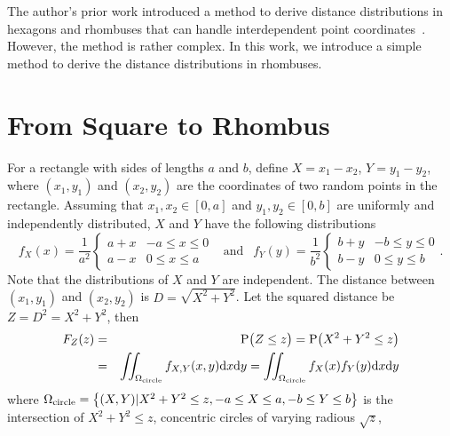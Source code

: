 \documentclass[12pt,draftclsnofoot,onecolumn]{IEEEtran}
\begin{document}
The author's prior work introduced a method to derive 
distance distributions in hexagons and rhombuses that can handle
interdependent point coordinates~\cite{zhuang2011random, 
zhuang2012geometrical}. However, the method is rather complex. In this 
work, we introduce a simple method to derive the distance distributions 
in rhombuses.

\section{From Square to Rhombus}
For a rectangle with sides of lengths $a$ and $b$, define $X=x_1-x_2$,
$Y=y_1-y_2$, where $(x_1, y_1)$ and $(x_2, y_2)$ are the coordinates of two
random points in the rectangle. Assuming that $x_1, x_2 \in [0,a]$ and $y_1, y_2 \in
[0, b]$ are uniformly and independently distributed, $X$ and $Y$ have the following
distributions
\begin{equation}\label{eq:fxy}
  f_X(x)=\frac{1}{a^2}\left\{
    \begin{array}{lr}
      a+x & -a\leq x \leq 0 \\
      a-x & 0 \leq x \leq a
    \end{array}
  \right.
  ~~\mbox{ and }~~ f_Y(y)=\frac{1}{b^2}\left\{
    \begin{array}{lr}
      b+y & -b\leq y \leq 0 \\
      b-y & 0 \leq y \leq b
    \end{array}
  \right..
\end{equation}
%
Note that the distributions of $X$ and $Y$ are independent. The
distance between $(x_1, y_1)$ and $(x_2, y_2)$ is $D=\sqrt{X^2+Y^2}$. Let the
squared distance be $Z=D^2=X^2+Y^2$, then
\begin{eqnarray}\label{eq-rec}
F_Z(z)&=& {\rm P}\big(Z \leq z \big) = {\rm P}\big(X^2+Y^2 \leq z \big)\nonumber\\
&=&\iint_{\Omega_{\rm circle}}f_{X,Y}(x,y){\rm d}x{\rm d}y=
\iint_{\Omega_{\rm circle}}f_X(x)f_Y(y){\rm d}x{\rm d}y
\end{eqnarray}
where $\Omega_{\rm circle}=\left\{(X,Y)|X^2+Y^2\leq z, -a \leq X \leq a, -b \leq Y \leq b\right\}$
is the intersection of $X^2+Y^2\leq z$, concentric circles of varying radious $\sqrt{z}$, 
\end{document}
